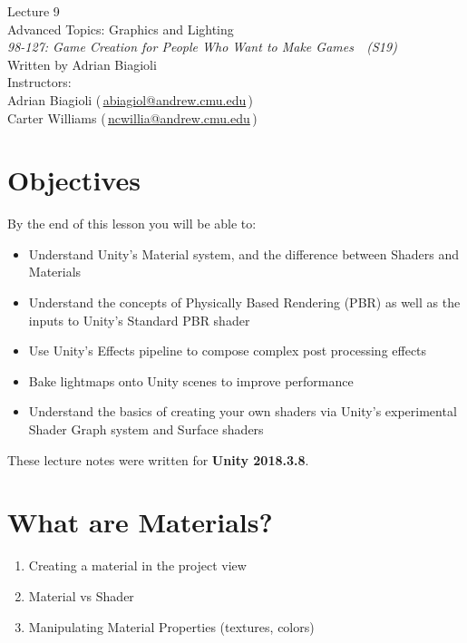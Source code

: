 \documentclass[11pt]{article}
\makeatletter
\newcommand{\lecturenum}{9}
\newcommand{\lecturename}{Advanced Topics: Graphics and Lighting}
\newcommand{\authorname}{Adrian Biagioli}
\newcommand{\coursenum}{98-127}
\newcommand{\coursename}{Game Creation for People Who Want to Make Games}
\newcommand{\coursesem}{S19}
\newcommand{\instructors}{Adrian Biagioli (\,\href{mailto:abiagiol@andrew.cmu.edu}{abiagiol@andrew.cmu.edu}\,) \\ Carter Williams (\,\href{mailto:ncwillia@andrew.cmu.edu}{ncwillia@andrew.cmu.edu}\,)}
\makeatother
\begin{document}
\thispagestyle{plain}
{
    \vspace{1.5em}
    \begin{center}
    {
        \huge
        Lecture \lecturenum \\
        \vspace{0.5em}
        \lecturename
        \vspace{0.4em}
    } \\
    {
        \it
        \coursenum: \coursename\ \ (\coursesem)
    } \\
    \vspace{1.0em}
    Written by \authorname \\
    \vspace{0.7em}
    Instructors:\\ \instructors
    \end{center}
}

\section{Objectives}

By the end of this lesson you will be able to:
\begin{itemize}
    \item Understand Unity's Material system, and the difference between Shaders and Materials
    \item Understand the concepts of Physically Based Rendering (PBR) as well as the inputs to Unity's Standard PBR shader
    \item Use Unity's Effects pipeline to compose complex post processing effects
    \item Bake lightmaps onto Unity scenes to improve performance
    \item Understand the basics of creating your own shaders via Unity's experimental Shader Graph system and Surface shaders
\end{itemize}

\noindent These lecture notes were written for {\bf Unity 2018.3.8}.

\section{What are Materials?}

\begin{enumerate}
	\item Creating a material in the project view
	\item Material vs Shader
	\item Manipulating Material Properties (textures, colors)
\end{enumerate}
\end{document}
